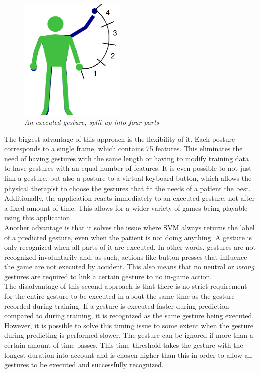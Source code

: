 \begin{figure}[H]
\begin{center}
\includegraphics[width=5cm]{SVMGesture.png}
\caption{\emph{An executed gesture, split up into four parts}}
\label{fig: gesture_split}
\end{center}
\end{figure}

The biggest advantage of this approach is the flexibility of it. Each posture corresponds to a single frame, which contains 75 features. This eliminates the need of having gestures with the same length or having to modify training data to have gestures with an equal number of features. It is even possible to not just link a gesture, but also a posture to a virtual keyboard button, which allows the physical therapist to choose the gestures that fit the needs of a patient the best. Additionally, the application reacts immediately to an executed gesture, not after a fixed amount of time. This allows for a wider variety of games being playable using this application.\\

Another advantage is that it solves the issue where SVM always returns the label of a predicted gesture, even when the patient is not doing anything. A gesture is only recognized when all parts of it are executed. In other words, gestures are not recognized involuntarily and, as such, actions like button presses that influence the game are not executed by accident. This also means that no neutral or \emph{wrong} gestures are required to link a certain gesture to no in-game action.\\

The disadvantage of this second approach is that there is no strict requirement for the entire gesture to be executed in about the same time as the gesture recorded during training. If a gesture is executed faster during prediction compared to during training, it is recognized as the same gesture being executed. However, it is possible to solve this timing issue to some extent when the gesture during predicting is performed slower. The gesture can be ignored if more than a certain amount of time passes. This time threshold takes the gesture with the longest duration into account and is chosen higher than this in order to allow all gestures to be executed and successfully recognized.